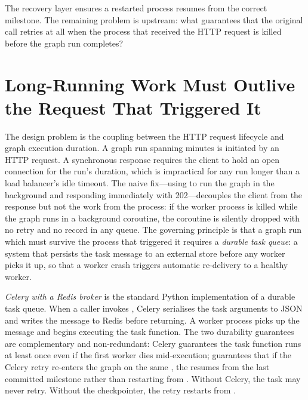 The recovery layer ensures a restarted process resumes from the correct
milestone. The remaining problem is upstream: what guarantees that the
original  call retries at all when the process that received
the HTTP request is killed before the graph run completes?


\section{Long-Running Work Must Outlive the Request That Triggered It}
\label{sec:durable-celery}

The design problem is the coupling between the HTTP request lifecycle and
graph execution duration. A graph run spanning minutes is initiated by an
HTTP  request. A synchronous response requires the client to
hold an open connection for the run's duration, which is impractical for
any run longer than a load balancer's idle timeout. The naive fix---using
 to run the graph in the background and
responding immediately with 202---decouples the client from the response
but not the work from the process: if the worker process is killed while
the graph runs in a background coroutine, the coroutine is silently dropped
with no retry and no record in any queue. The governing principle is that a
graph run which must survive the process that triggered it requires a
\emph{durable task queue}: a system that persists the task message to an
external store before any worker picks it up, so that a worker crash
triggers automatic re-delivery to a healthy worker.

\emph{Celery with a Redis broker} is the standard Python implementation
of a durable task queue. When a caller invokes
, Celery serialises the task
arguments to JSON and writes the message to Redis before returning. A
worker process picks up the message and begins executing the task function.
The two durability guarantees are complementary and non-redundant: Celery
guarantees the task function runs at least once even if the first worker
dies mid-execution;  guarantees that if the
Celery retry re-enters the graph on the same , the
 resumes from the last committed milestone rather than
restarting from . Without Celery, the task may never retry.
Without the checkpointer, the retry restarts from .

